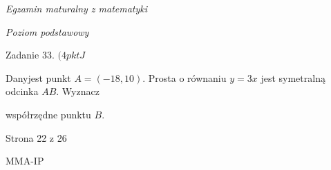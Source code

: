 \documentclass[a4paper,12pt]{article}
\begin{document}
{\it Egzamin maturalny z matematyki}

{\it Poziom podstawowy}

Zadanie 33. $(4pktJ$

Danyjest punkt $A=(-18,10)$. Prosta o równaniu $y=3x$ jest symetralną odcinka $AB$. Wyznacz

współrzędne punktu $B.$

Strona 22 z 26

MMA-IP
\end{document}
